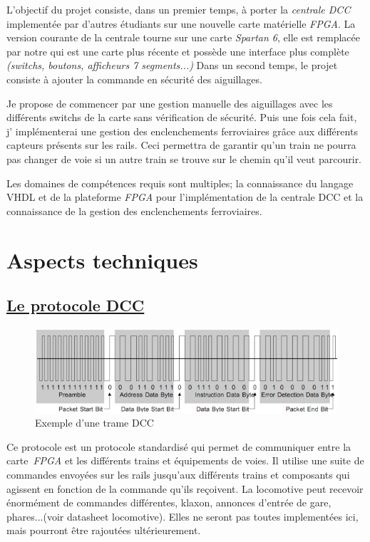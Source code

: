 L'objectif du projet consiste, dans un premier temps, à porter la
\emph{centrale DCC} implement\'ee par d'autres \'etudiants sur une nouvelle
carte mat\'erielle \emph{FPGA}. La version courante de la centrale tourne sur
une carte \emph{Spartan 6}, elle est remplac\'ee par notre \crt qui est
une carte plus r\'ecente et possède une interface plus complète
\emph{(switchs, boutons, afficheurs 7 segments...)}
Dans un second temps, le projet consiste à ajouter la commande en
sécurité des aiguillages.

Je propose de commencer par une gestion manuelle des aiguillages avec
les diff\'erents switchs de la carte sans v\'erification de
s\'ecurit\'e.
Puis une fois cela fait, j' impl\'ementerai une gestion des
enclenchements ferroviaires grâce aux différents capteurs pr\'esents sur
les rails. Ceci permettra de garantir qu'un train ne pourra pas
changer de voie si un autre train se trouve sur le chemin
qu'il veut parcourir. 

Les domaines de comp\'etences requis sont multiples; la connaissance
du langage VHDL et de la plateforme \emph{FPGA} pour l'impl\'ementation
de la centrale DCC et la connaissance de la gestion des enclenchements
ferroviaires.


\newpage
\section{Aspects techniques}
\label{sec:asp_tech}

\subsection{\underline{Le protocole DCC}}
\label{sec:dcc}


\begin{figure}[h]
\centering
\includegraphics[scale=0.75]{trame.png}
\caption{Exemple d'une trame DCC}
\label{fig1}
\end{figure}

Ce protocole est un protocole standardis\'e qui permet de communiquer
entre la carte~\emph{FPGA} et les diff\'erents trains et
équipements de voies.
Il utilise une suite de commandes envoy\'ees sur les rails
jusqu'aux diff\'erents trains et composants qui agissent en fonction de
la commande qu'ils reçoivent.
La locomotive peut recevoir \'enormément de commandes différentes,
klaxon, annonces d'entr\'ee de gare, phares...(voir datasheet
locomotive). Elles ne seront pas toutes implement\'ees ici, mais
pourront \^etre rajout\'ees ult\'erieurement. 


